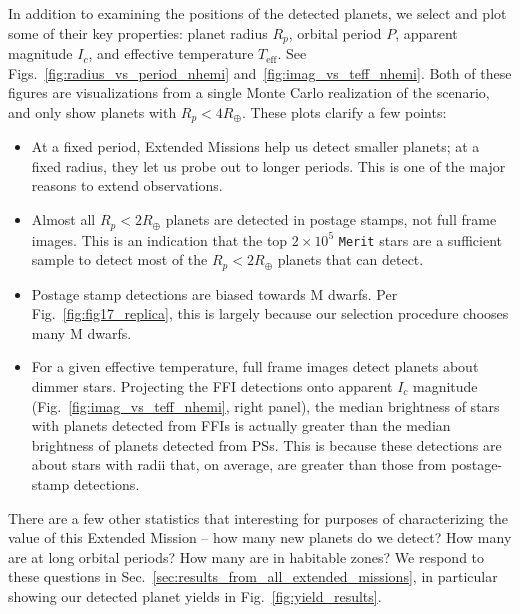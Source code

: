 In addition to examining the positions of the detected planets, we select and plot some of their key properties:
planet radius $R_p$, orbital period $P$, apparent magnitude $I_c$, and effective temperature $T_\mathrm{eff}$.
See Figs.~\ref{fig:radius_vs_period_nhemi} and~\ref{fig:imag_vs_teff_nhemi}.
Both of these figures are visualizations from a single Monte Carlo realization of the \nhemi\:scenario, and only show planets with $R_p < 4R_\oplus$.
These plots clarify a few points:
\begin{itemize}
	\item At a fixed period, Extended Missions help us detect smaller planets; at a fixed radius, they let us probe out to longer periods. This is one of the major reasons to extend \tesss observations.
	\item Almost all $R_p<2R_\oplus$ planets are detected in postage stamps, not full frame images. This is an indication that the top $2\times10^5$ \texttt{Merit} stars are a sufficient sample to detect most of the $R_p<2R_\oplus$ planets that \tess can detect.
	\item Postage stamp detections are biased towards M dwarfs. Per Fig.~\ref{fig:fig17_replica}, this is largely because our selection procedure chooses many M dwarfs.
	\item For a given effective temperature, full frame images detect planets about dimmer stars. Projecting the FFI detections onto apparent $I_c$ magnitude (Fig.~\ref{fig:imag_vs_teff_nhemi}, right panel), the median brightness of stars with planets detected from FFIs is actually greater than the median brightness of planets detected from PSs. This is because these detections are about stars with radii that, on average, are greater than those from postage-stamp detections.
\end{itemize}

There are a few other statistics that interesting for purposes of characterizing the value of this Extended Mission -- how many new planets do we detect? How many are at long orbital periods? How many are in habitable zones? We respond to these questions in Sec.~\ref{sec:results_from_all_extended_missions}, in particular showing our detected planet yields in Fig.~\ref{fig:yield_results}.
